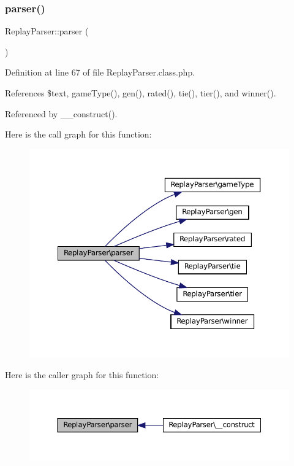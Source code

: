 \subsubsection{\texorpdfstring{parser()}{parser()}}
{\footnotesize\ttfamily Replay\+Parser\+::parser (\begin{DoxyParamCaption}{ }\end{DoxyParamCaption})\hspace{0.3cm}{\ttfamily [private]}}



Definition at line 67 of file Replay\+Parser.\+class.\+php.



References \$text, game\+Type(), gen(), rated(), tie(), tier(), and winner().



Referenced by \+\_\+\+\_\+construct().

Here is the call graph for this function\+:\nopagebreak
\begin{figure}[H]
\begin{center}
\leavevmode
\includegraphics[width=350pt]{class_replay_parser_a06e573b897046a2755693c8fd923c70b_cgraph}
\end{center}
\end{figure}
Here is the caller graph for this function\+:\nopagebreak
\begin{figure}[H]
\begin{center}
\leavevmode
\includegraphics[width=350pt]{class_replay_parser_a06e573b897046a2755693c8fd923c70b_icgraph}
\end{center}
\end{figure}
\mbox{\label{class_replay_parser_a42c1054e4e59fa30a1582c8a9f625a54}} 
